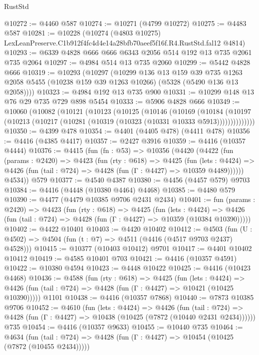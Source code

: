 \begin{lexlean}{RustStd}
\begin{coremodule}
@10272 := @4460 @587
@10274 := @10271 (@4799 @10272)
@10275 := @4483 @587
@10281 := @10228
    (@10274 (@4803 @10275) LexLeanPreserve.C1b912f4fc4d4e14a28bfb70aeef5f16f.R4.RustStd.fal12 @4814)
@10293 := @6339 @4828 @666 @666 @6343 @2056 @514 @192 @13 @735 @2061 @735 @2064
@10297 := @4984 @514 @13 @735 @2060
@10299 := @5442 @4828 @666
@10319 := @10293
    (@10297
      (@10299
        @136
        @13
        @159
        @39
        @735
        @1263
        @2058
        @5455
        (@10238 @159 @39 @1263 @10266)
        (@5328 (@5490 @136 @13 @2058))))
@10323 := @4984 @192 @13 @735 @900
@10331 := @10299 @148 @13 @76 @29 @735 @729 @898 @5454
@10333 := @5906 @4828 @666
@10349 := @10060
    (@10082
      (@10121
        (@10123
          (@10125
            (@10146
              (@10169
                (@10184
                  (@10197 (@10213 (@10217 (@10281 (@10319 (@10323 (@10331 @10333 @5913))))))))))))))
@10350 := @4399 @478
@10354 := @4401 (@4405 @478) (@4411 @478)
@10356 := @4416 (@4385 @4417)
@10357 := @2427 @3916
@10359 := @4416 (@10357 @4444)
@10376 := @4415
    (fun (fn : @53) =>
    @10356
      (@4420
        (@4422
          (fun (params : @2420) =>
          @4423
            (fun (rty : @618) =>
            @4425
              (fun (lets : @4424) =>
              @4426 (fun (tail : @724) => @4428 (fun (Γ : @4427) => @10359 @4489))))))
        @4534))
    @579
@10377 := @4540 @4387
@10380 := @4456 (@4457 @579) @9703
@10384 := @4416 (@4448 (@10380 @4464) @4468)
@10385 := @4480 @579
@10390 := @4477 (@4479 @10385 @9706 @2431 @2434)
@10401 := fun (params : @2420) =>
  @4423
    (fun (rty : @618) =>
    @4425
      (fun (lets : @4424) =>
      @4426 (fun (tail : @724) => @4428 (fun (Γ : @4427) => @10359 (@10384 @10390)))))
@10402 := @4422 @10401
@10403 := @4420 @10402
@10412 := @4503 (fun (U : @4502) => @4504 (fun (t : @7) => @4511 (@4416 (@4517 @9703 @2437) @4528)))
@10415 := @10377 (@10403 @10412) @9701
@10417 := @4401 @10402 @10412
@10419 := @4585 @10401 @703
@10421 := @4416 (@10357 @4591)
@10422 := @10380 @4594
@10423 := @4448 @10422
@10425 := @4416 (@10423 @4468)
@10436 := @4588
    (fun (rty : @618) =>
    @4425
      (fun (lets : @4424) =>
      @4426 (fun (tail : @724) => @4428 (fun (Γ : @4427) => @10421 (@10425 @10390)))))
    @1101
@10438 := @4416 (@10357 @7868)
@10440 := @7873 @10385 @9706
@10452 := @4610
    (fun (lets : @4424) =>
    @4426
      (fun (tail : @724) =>
      @4428 (fun (Γ : @4427) => @10438 (@10425 (@7872 (@10440 @2431 @2434))))))
    @735
@10454 := @4416 (@10357 @9633)
@10455 := @10440 @735
@10464 := @4634
    (fun (tail : @724) => @4428 (fun (Γ : @4427) => @10454 (@10425 (@7872 (@10455 @2434)))))

\end{coremodule}
\end{lexlean}
